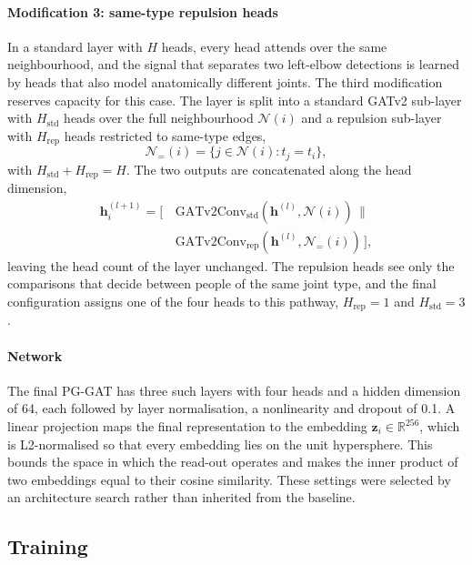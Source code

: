 \paragraph{Modification 3: same-type repulsion heads}
In a standard layer with $H$ heads, every head attends over the same neighbourhood,
and the signal that separates two left-elbow detections is learned by heads that also model anatomically different
joints.
The third modification reserves capacity for this case.
The layer is split into a standard GATv2 sub-layer with $H_{\text{std}}$ heads over the full neighbourhood $\mathcal{N}(i)$
and a repulsion sub-layer with $H_{\text{rep}}$ heads restricted to same-type edges,
\begin{equation}
    \mathcal{N}_{=}(i)
    =
    \{j \in \mathcal{N}(i) : t_j=t_i\},
    \label{eq:same_type_nbhd}
\end{equation}
with $H_{\text{std}}+H_{\text{rep}}=H$.
The two outputs are concatenated along the head dimension,
\begin{align}
    \mathbf{h}_i^{(l+1)}
    =
    \bigl[\,
        &\mathrm{GATv2Conv}_{\text{std}}
        (\mathbf{h}^{(l)},\mathcal{N}(i))
        \,\big\|\, \nonumber \\
        &\mathrm{GATv2Conv}_{\text{rep}}
        (\mathbf{h}^{(l)},\mathcal{N}_{=}(i))
    \,\bigr],
    \label{eq:pggat_repulsion}
\end{align}
leaving the head count of the layer unchanged.
The repulsion heads see only the comparisons that decide between people of the same joint type,
and the final configuration assigns one of the four heads to this pathway, $H_{\text{rep}}=1$ and $H_{\text{std}}=3$.

\paragraph{Network}
The final PG-GAT has three such layers with four heads and a hidden dimension of 64,
each followed by layer normalisation, a nonlinearity and dropout of 0.1.
A linear projection maps the final representation to the embedding $\mathbf{z}_i \in \mathbb{R}^{256}$,
which is L2-normalised so that every embedding lies on the unit hypersphere.
This bounds the space in which the read-out operates and makes the inner product of two embeddings equal to their cosine
similarity.
These settings were selected by an architecture search rather than inherited from the baseline.

\subsection{Training}
\label{sec:method_training}

